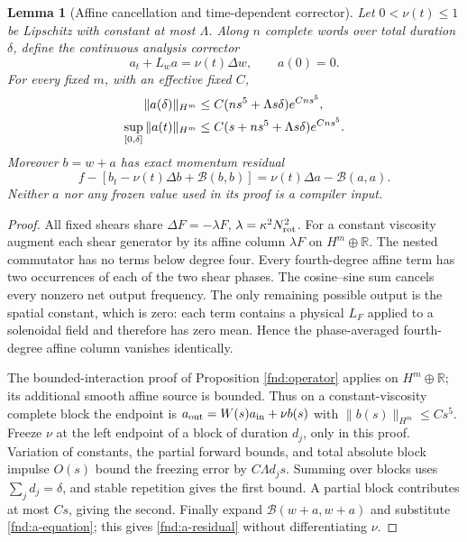 \documentclass[11pt,a4paper]{amsart}
\newtheorem{lemma}[theorem]{Lemma}
\theoremstyle{definition}
\theoremstyle{remark}
\numberwithin{equation}{section}
\newcommand{\Bcal}{\mathcal B}
\begin{document}
\begin{lemma}[Affine cancellation and time-dependent corrector]
\label{fnd:affine}
Let $0<\nu(t)\le1$ be Lipschitz with constant at most $\Lambda$. Along $n$
complete words over total duration $\delta$, define the continuous analysis
corrector
\begin{equation}
 a_t+L_wa=\nu(t)\Delta w,\qquad a(0)=0.
 \label{fnd:a-equation}
\end{equation}
For every fixed $m$, with an effective fixed $C$,
\begin{align}
 \|a(\delta)\|_{H^m}&\le C(ns^5+\Lambda s\delta)e^{Cns^5},\notag\\
 \sup_{[0,\delta]}\|a(t)\|_{H^m}
 &\le C(s+ns^5+\Lambda s\delta)e^{Cns^5}.
 \label{fnd:a-bound}
\end{align}
Moreover $b=w+a$ has exact momentum residual
\begin{equation}
 f-[b_t-\nu(t)\Delta b+\Bcal(b,b)]=\nu(t)\Delta a-\Bcal(a,a).
 \label{fnd:a-residual}
\end{equation}
Neither $a$ nor any frozen value used in its proof is a compiler input.
\end{lemma}
\begin{proof}
All fixed shears share $\Delta F=-\lambda F$, $\lambda=\kappa^2N_{\rm rot}^2$.
For a constant viscosity augment each shear generator by its affine column
$\lambda F$ on $H^m\oplus\mathbb R$. The nested commutator has no terms below
degree four. Every fourth-degree affine term has two occurrences of each of
the two shear phases. The cosine--sine sum cancels every nonzero net output
frequency. The only remaining possible output is the spatial constant, which
is zero: each term contains a physical $L_F$ applied to a solenoidal field and
therefore has zero mean. Hence the phase-averaged fourth-degree affine column
vanishes identically.

The bounded-interaction proof of Proposition \ref{fnd:operator} applies on
$H^m\oplus\mathbb R$; its additional smooth affine source is bounded. Thus on
a constant-viscosity complete block the endpoint is
$a_{\rm out}=W(s)a_{\rm in}+\nu b(s)$ with
$\|b(s)\|_{H^m}\le Cs^5$.
Freeze $\nu$ at the left endpoint of a block of duration $d_j$, only in this
proof. Variation of constants, the partial forward bounds, and total absolute
block impulse $O(s)$ bound the freezing error by $C\Lambda d_js$. Summing over
blocks uses $\sum_jd_j=\delta$, and stable repetition gives the first bound.
A partial block contributes at most $Cs$, giving the second. Finally expand
$\Bcal(w+a,w+a)$ and substitute \eqref{fnd:a-equation}; this gives
\eqref{fnd:a-residual} without differentiating $\nu$.
\end{proof}
\end{document}

